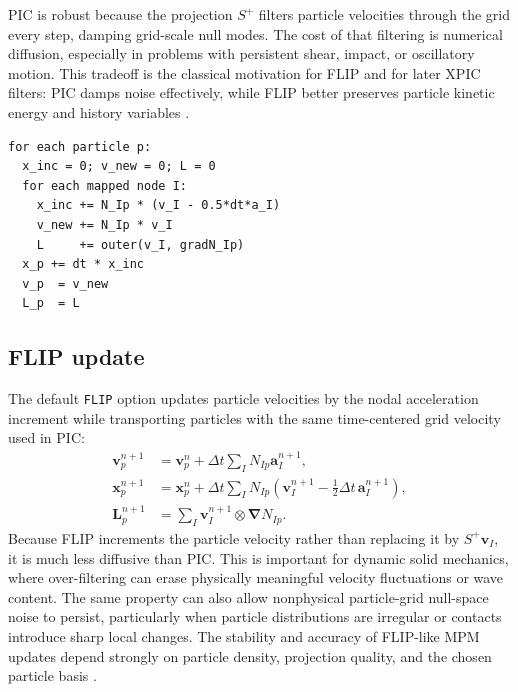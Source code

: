 PIC is robust because the projection $S^+$ filters particle velocities through the grid every step, damping grid-scale null modes.  The cost of that filtering is numerical diffusion, especially in problems with persistent shear, impact, or oscillatory motion.  This tradeoff is the classical motivation for FLIP and for later XPIC filters: PIC damps noise effectively, while FLIP better preserves particle kinetic energy and history variables \cite{sulsky1995solid,brackbill1988flip,hammerquist2017xpic}.

\begin{lstlisting}[caption={PIC grid-to-particle update.},basicstyle=\ttfamily\small]
for each particle p:
  x_inc = 0; v_new = 0; L = 0
  for each mapped node I:
    x_inc += N_Ip * (v_I - 0.5*dt*a_I)
    v_new += N_Ip * v_I
    L     += outer(v_I, gradN_Ip)
  x_p += dt * x_inc
  v_p  = v_new
  L_p  = L
\end{lstlisting}

\subsection{FLIP update}
\label{subsec:flip-update}

The default \texttt{FLIP} option updates particle velocities by the nodal acceleration increment while transporting particles with the same time-centered grid velocity used in PIC:
\begin{align}
  \boldsymbol{v}^{n+1}_p
    &= \boldsymbol{v}^{n}_p
     +\Delta t\sum_I N_{Ip}\boldsymbol{a}^{n+1}_I,
  \label{eq:flip-velocity}\\
  \boldsymbol{x}^{n+1}_p
    &= \boldsymbol{x}^{n}_p
     +\Delta t\sum_I N_{Ip}\left(\boldsymbol{v}^{n+1}_I
       -\frac{1}{2}\Delta t\,\boldsymbol{a}^{n+1}_I\right),
  \label{eq:flip-position}\\
  \boldsymbol{L}^{n+1}_p
    &= \sum_I \boldsymbol{v}^{n+1}_I\otimes\boldsymbol{\nabla}N_{Ip}.
  \label{eq:flip-velocity-gradient}
\end{align}
Because FLIP increments the particle velocity rather than replacing it by $S^+\boldsymbol{v}_I$, it is much less diffusive than PIC.  This is important for dynamic solid mechanics, where over-filtering can erase physically meaningful velocity fluctuations or wave content.  The same property can also allow nonphysical particle-grid null-space noise to persist, particularly when particle distributions are irregular or contacts introduce sharp local changes.  The stability and accuracy of FLIP-like MPM updates depend strongly on particle density, projection quality, and the chosen particle basis \cite{brackbill1988flip,sulsky1995solid,wallstedt2007projection,wallstedt2008explicit}.

